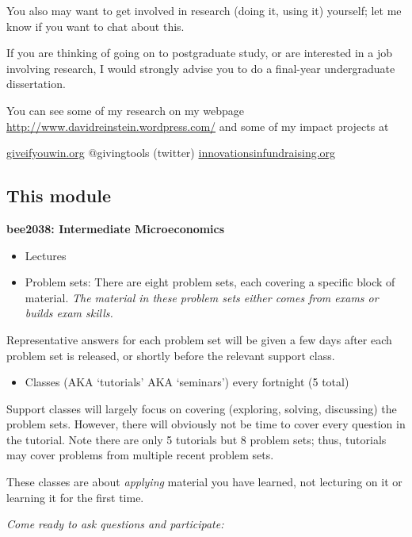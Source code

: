 \documentclass[]{article}
\providecommand{\tightlist}{%
  \setlength{\itemsep}{0pt}\setlength{\parskip}{0pt}}
\begin{document}
\bigskip

You also may want to get involved in research (doing it, using it)
yourself; let me know if you want to chat about this.

If you are thinking of going on to postgraduate study, or are interested
in a job involving research, I would strongly advise you to do a
final-year undergraduate dissertation.

You can see some of my research on my webpage
\url{http://www.davidreinstein.wordpress.com/} and some of my impact
projects at

\url{giveifyouwin.org} @givingtools (twitter)
\url{innovationsinfundraising.org}

\hypertarget{this-module}{%
\subsection{This module}\label{this-module}}

\textbf{bee2038: Intermediate Microeconomics}

\begin{itemize}
\item
  Lectures
\item
  Problem sets: There are eight problem sets, each covering a specific
  block of material. \emph{The material in these problem sets either
  comes from exams or builds exam skills.}
\end{itemize}

Representative answers for each problem set will be given a few days
after each problem set is released, or shortly before the relevant
support class.

\begin{itemize}
\tightlist
\item
  Classes (AKA `tutorials' AKA `seminars') every fortnight (5 total)
\end{itemize}

Support classes will largely focus on covering (exploring, solving,
discussing) the problem sets. However, there will obviously not be time
to cover every question in the tutorial. Note there are only 5 tutorials
but 8 problem sets; thus, tutorials may cover problems from multiple
recent problem sets.

These classes are about \emph{applying} material you have learned, not
lecturing on it or learning it for the first time.

\bigskip

\emph{Come ready to ask questions and participate:}
\end{document}

